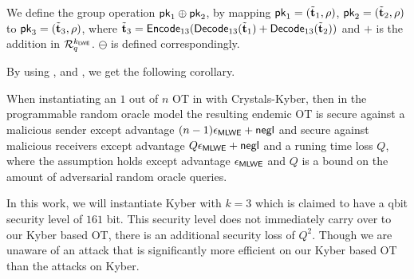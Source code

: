 We define the group operation $\mathsf{pk}_1\oplus\mathsf{pk}_2$, by mapping $\mathsf{pk}_1=(\tilde{{\mathbf t}}_1,\rho)$, $\mathsf{pk}_2=(\tilde{{\mathbf t}}_2,\rho)$ to $\mathsf{pk}_3=(\tilde{{\mathbf t}}_3, \rho)$, where $\tilde{{\mathbf t}}_3=\mathsf{Encode}_{13}(\mathsf{Decode}_{13}(\tilde{{\mathbf t}}_1)+\mathsf{Decode}_{13}(\tilde{{\mathbf t}}_2))$ and $+$ is the addition in $\mathcal R_q^{k_{\mathsf{LWE}}}$. $\ominus$ is defined correspondingly. 

By using ,  and , we get the following corollary.
 
\begin{corollary}
When instantiating an $1$ out of $n$ OT in  with Crystals-Kyber, then in the programmable random oracle model the resulting endemic OT is secure against a malicious sender except advantage $(n-1)\epsilon_{\mathsf{MLWE}}+\mathsf{negl}$  and secure against malicious receivers except advantage $Q\epsilon_{\mathsf{MLWE}}+\mathsf{negl}$ and a runing time loss $Q$, where the \MLWE assumption holds except advantage $\epsilon_{\mathsf{MLWE}}$ and $Q$ is a bound on the amount of adversarial random oracle queries.
\end{corollary}

In this work, we will instantiate Kyber with $k=3$ which is claimed to have a qbit security level of $161$ bit. This security level does not immediately carry over to our Kyber based OT, there is an additional security loss of $Q^2$. Though we are unaware of an attack that is significantly more efficient on our Kyber based OT than the attacks on Kyber.